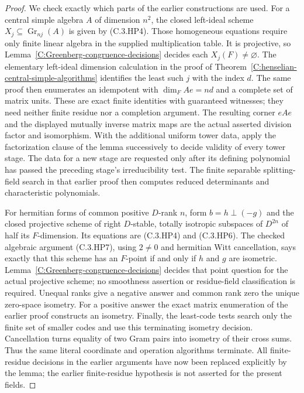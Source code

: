 \begin{proof}
We check exactly which parts of the earlier constructions are used.
For a central simple algebra $A$ of dimension $n^2$, the closed
left-ideal scheme $X_j\subseteq\operatorname{Gr}_{nj}(A)$ is given
by (C.3.HP4).  Those homogeneous equations require only finite
linear algebra in the supplied multiplication table.  It is projective,
so Lemma~\ref{C:Greenberg-congruence-decisions} decides each
$X_j(F)\ne\varnothing$.  The elementary left-ideal dimension
calculation in the proof of
Theorem~\ref{C:henselian-central-simple-algorithms} identifies
the least such $j$ with the index $d$.
The same proof then enumerates an idempotent with
$\dim_F Ae=nd$ and a complete set of matrix units.
These are exact finite identities with guaranteed witnesses;
they need neither finite residue nor a completion argument.
The resulting corner $eAe$ and the displayed mutually inverse
matrix maps are the actual asserted division factor and isomorphism.
With the additional uniform tower data, apply the factorization clause
of the lemma successively to decide validity of every tower stage.
The data for a new stage are requested only after its defining
polynomial has passed the preceding stage's irreducibility test.
The finite separable splitting-field search in that earlier proof
then computes reduced determinants and characteristic polynomials.

For hermitian forms of common positive $D$-rank $n$, form
$b=h\perp(-g)$ and the closed projective scheme of right
$D$-stable, totally isotropic subspaces of $D^{2n}$ of half its
$F$-dimension.  Its equations are (C.3.HP4) and (C.3.HP6).
The checked algebraic argument (C.3.HP7), using $2\ne0$ and
hermitian Witt cancellation, says exactly that this scheme has
an $F$-point if and only if $h$ and $g$ are isometric.
Lemma~\ref{C:Greenberg-congruence-decisions} decides that point
question for the actual projective scheme; no smoothness assertion
or residue-field classification is required.
Unequal ranks give a negative answer and common rank zero the
unique zero-space isometry.  For a positive answer the exact
matrix enumeration of the earlier proof constructs an isometry.
Finally, the least-code tests search only the finite set of smaller
codes and use this terminating isometry decision.  Cancellation
turns equality of two Gram pairs into isometry of their cross sums.
Thus the same literal coordinate and operation algorithms terminate.
All finite-residue decisions in the earlier arguments have now been
replaced explicitly by the lemma; the earlier finite-residue
hypothesis is not asserted for the present fields.
\end{proof}
